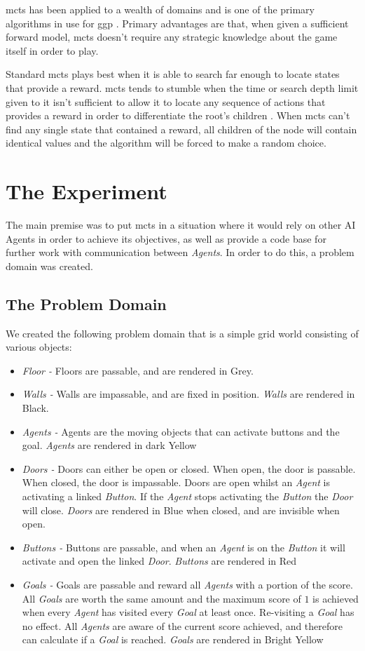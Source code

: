 \documentclass{IEEEtran}
\begin{document}
\gls{mcts} \cite{browne2012survey} has been applied to a wealth of domains and is one of the primary algorithms in use for \gls{ggp} \cite{finnsson2008simulation}. Primary advantages are that, when given a sufficient forward model, \gls{mcts} doesn't require any strategic knowledge about the game itself in order to play.

Standard \gls{mcts} plays best when it is able to search far enough to locate states that provide a reward. \gls{mcts} tends to stumble when the time or search depth limit given to it isn't sufficient to allow it to locate any sequence of actions that provides a reward in order to differentiate the root's children \cite{perez2012monte}. When \gls{mcts} can't find any single state that contained a reward, all children of the node will contain identical values and the algorithm will be forced to make a random choice.

\section{The Experiment}
The main premise was to put \gls{mcts} in a situation where it would rely on other AI Agents in order to achieve its objectives, as well as provide a code base for further work with communication between \emph{Agents}. In order to do this, a problem domain was created.
\subsection{The Problem Domain}
We created the following problem domain that is a simple grid world consisting of various objects:
\begin{itemize}
\item{\emph{Floor - } Floors are passable, and are rendered in Grey.}
\item{\emph{Walls -} Walls are impassable, and are fixed in position. \emph{Walls} are rendered in Black.}
\item{\emph{Agents -} Agents are the moving objects that can activate buttons and the goal. \emph{Agents} are rendered in dark Yellow}
\item{\emph{Doors -} Doors can either be open or closed. When open, the door is passable. When closed, the door is impassable. Doors are open whilst an \emph{Agent} is activating a linked \emph{Button}. If the \emph{Agent} stops activating the \emph{Button} the \emph{Door} will close. \emph{Doors} are rendered in Blue when closed, and are invisible when open.}
\item{\emph{Buttons -} Buttons are passable, and when an \emph{Agent} is on the \emph{Button} it will activate and open the linked \emph{Door}. \emph{Buttons} are rendered in Red}
\item{\emph{Goals -} Goals are passable and reward all \emph{Agents} with a portion of the score. All \emph{Goals} are worth the same amount and the maximum score of $1$ is achieved when every \emph{Agent} has visited every \emph{Goal} at least once. Re-visiting a \emph{Goal} has no effect. All \emph{Agents} are aware of the current score achieved, and therefore can calculate if a \emph{Goal} is reached. \emph{Goals} are rendered in Bright Yellow}
\end{itemize}
\end{document}
